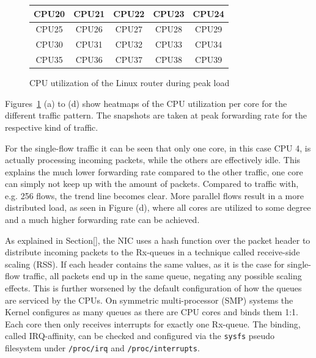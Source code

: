 \documentclass[IN,11pt,twoside,openright,master,english]{tumthesis}
\begin{document}
\begin{figure}[h]
{{\begin{tabular}[htp]{|c|c|c|c|c|}
\hline
\cellcolor{TUMBlue!62} CPU20 & \cellcolor{TUMBlue!93} CPU21 & \cellcolor{TUMBlue!62} CPU22 & \cellcolor{TUMBlue!91} CPU23 & \cellcolor{TUMBlue!93} CPU24 \\
\hline
\cellcolor{TUMBlue!92} CPU25 & \cellcolor{TUMBlue!93} CPU26 & \cellcolor{TUMBlue!93} CPU27 & \cellcolor{TUMBlue!77} CPU28 & \cellcolor{TUMBlue!93} CPU29 \\
\hline
\cellcolor{TUMBlue!91} CPU30 & \cellcolor{TUMBlue!93} CPU31 & \cellcolor{TUMBlue!93} CPU32 & \cellcolor{TUMBlue!93} CPU33 & \cellcolor{TUMBlue!93} CPU34 \\
\hline
\cellcolor{TUMBlue!84} CPU35 & \cellcolor{TUMBlue!93} CPU36 & \cellcolor{TUMBlue!92} CPU37 & \cellcolor{TUMBlue!89} CPU38 & \cellcolor{TUMBlue!93} CPU39 \\
\hline
			\end{tabular}
		}
	}
	\caption{CPU utilization of the Linux router during peak load}
	\label{fig:linux-router-60bytes-heatmap}
\end{figure}


Figures~\ref{fig:linux-router-60bytes-heatmap} (a) to (d) show heatmaps of the CPU utilization per core for the different traffic pattern. The snapshots are taken at peak forwarding rate for the respective kind of traffic.

For the single-flow traffic it can be seen that only one core, in this case CPU 4, is actually processing incoming packets, while the others are effectively idle.
This explains the much lower forwarding rate compared to the other traffic, one core can simply not keep up with the amount of packets. 
Compared to traffic with, e.g. 256 flows, the trend line becomes clear. More parallel flows result in a more distributed load, as seen in Figure (d), where all cores are utilized to some degree and a much higher forwarding rate can be achieved.

As explained in Section\ref{}, the NIC uses a hash function over the packet header to distribute incoming packets to the Rx-queues in a technique called receive-side scaling (RSS). If each header contains the same values, as it is the case for single-flow traffic, all packets end up in the same queue, negating any possible scaling effects. This is further worsened by the default configuration of how the queues are serviced by the CPUs. On symmetric multi-processor (SMP) systems the Kernel configures as many queues as there are CPU cores and binds them 1:1. Each core then only receives interrupts for exactly one Rx-queue. The binding, called IRQ-affinity\cite{}, can be checked and configured via the \texttt{sysfs} pseudo filesystem under \texttt{/proc/irq} and \texttt{/proc/interrupts}.
\end{document}
